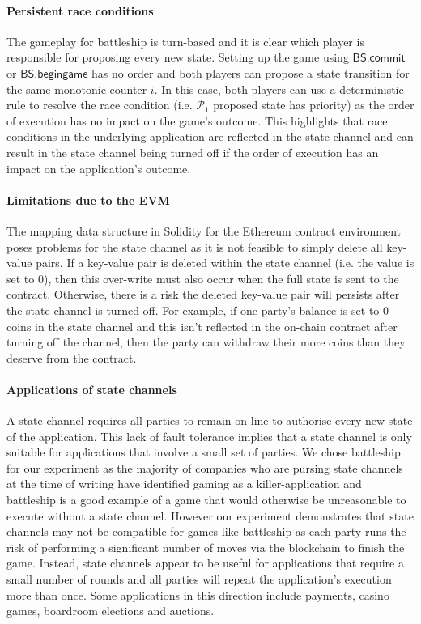 \documentclass{llncs}
\newcommand{\participant}{\mathcal{P}}
\newcommand{\battleshipbegin}{\mathsf{BS.begingame}}
\newcommand{\battleshipcommit}{\mathsf{BS.commit}}
\begin{document}
\paragraph{Persistent race conditions} 
The gameplay for battleship is turn-based and it is clear which player is responsible for proposing every new state. 
Setting up the game using $\battleshipcommit$ or $\battleshipbegin$ has no order and both players can propose a state transition for the same monotonic counter $i$. 
In this case, both players can use a deterministic rule to resolve the race condition (i.e. $\participant_{1}$ proposed state has priority) as the order of execution has no impact on the game's outcome. 
This highlights that race conditions in the underlying application are reflected in the state channel and can result in the state channel being turned off if the order of execution has an impact on the application's outcome. 

\paragraph{Limitations due to the EVM} 
The mapping data structure in Solidity for the Ethereum contract environment poses problems for the state channel as it is not feasible to simply delete all key-value pairs. 
If a key-value pair is deleted within the state channel (i.e. the value is set to 0), then this over-write must also occur when the full state is sent to the contract. 
Otherwise, there is a risk the deleted key-value pair will persists after the state channel is turned off.
For example, if one party's balance is set to 0 coins in the state channel and this isn't reflected in the on-chain contract after turning off the channel, then the party can withdraw their more coins than they deserve from the contract. 

\paragraph{Applications of state channels} 
A state channel requires all parties to remain on-line to authorise every new state of the application.
This lack of fault tolerance implies that a state channel is only suitable for applications that involve a small set of parties. 
We chose battleship for our experiment as the majority of companies who are pursing state channels at the time of writing have identified gaming as a killer-application and battleship is a good example of a game that would otherwise be unreasonable to execute without a state channel. 
However our experiment demonstrates that state channels may not be compatible for games like battleship as each party runs the risk of performing a significant number of moves via the blockchain to finish the game. 
Instead, state channels appear to be  useful for applications that require a small number of rounds and all parties will repeat the application's execution more than once. 
Some applications in this direction include payments, casino games, boardroom elections and auctions.
\end{document}
